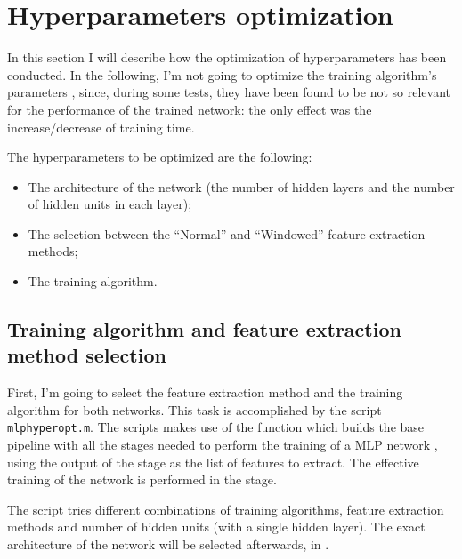 \section{Hyperparameters optimization}\label{sec:mlphyperopt}

In this section I will describe how the optimization of hyperparameters has
been conducted. In the following, I'm not going to optimize the training
algorithm's parameters , since, during some tests,
they have been found to be not so relevant for the performance of the trained
network: the only effect was the increase/decrease of training time.

The hyperparameters to be optimized are the following:
\begin{itemize}
\item The architecture of the network (the number of hidden layers and the
	number of hidden units in each layer);
\item The selection between the ``Normal'' and ``Windowed'' feature extraction
	methods;
\item The training algorithm.
\end{itemize}

\subsection{Training algorithm and feature extraction meth\-od
selection}\label{subsec:mlphyperopt}

First, I'm going to select the feature extraction method and the training
algorithm for both networks. This task is accomplished by the script
\texttt{mlphyperopt.m}. The scripts makes use of the 
function which builds the base pipeline with all the stages needed to perform
the training of a MLP network , using the output of the
 stage  as the list of features
to extract. The effective training of the network is performed in the
 stage.

The script tries different combinations of training algorithms, feature
extraction methods and number of hidden units (with a single hidden layer). The
exact architecture of the network will be selected afterwards, in
.

